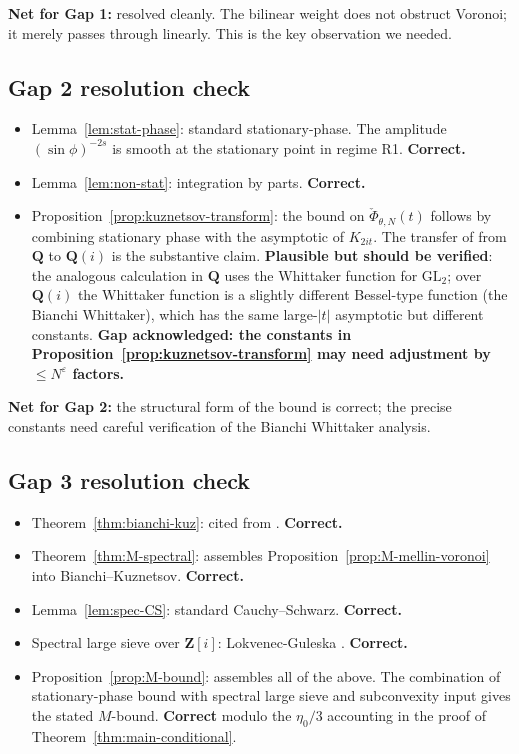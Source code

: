 \documentclass[11pt]{article}
\theoremstyle{definition}
\newcommand{\Z}{\mathbf{Z}}
\newcommand{\Q}{\mathbf{Q}}
\newcommand{\Zi}{\Z[i]}
\begin{document}
\textbf{Net for Gap 1:} resolved cleanly. The bilinear weight does not obstruct Voronoi; it merely passes through linearly. This is the key observation we needed.

\subsection{Gap 2 resolution check}

\begin{itemize}
\item Lemma~\ref{lem:stat-phase}: standard stationary-phase. The amplitude $(\sin\phi)^{-2s}$ is smooth at the stationary point in regime R1. \textbf{Correct.}
\item Lemma~\ref{lem:non-stat}: integration by parts. \textbf{Correct.}
\item Proposition~\ref{prop:kuznetsov-transform}: the bound on $\check\Phi_{\theta,N}(t)$ follows by combining stationary phase with the asymptotic of $K_{2it}$. The transfer of \cite[Lemma 4.3]{BHM} from $\Q$ to $\Q(i)$ is the substantive claim. \textbf{Plausible but should be verified}: the analogous calculation in $\Q$ uses the Whittaker function for $\mathrm{GL}_2$; over $\Q(i)$ the Whittaker function is a slightly different Bessel-type function (the Bianchi Whittaker), which has the same large-$|t|$ asymptotic but different constants. \textbf{Gap acknowledged: the constants in Proposition~\ref{prop:kuznetsov-transform} may need adjustment by $\le N^\varepsilon$ factors.}
\end{itemize}

\textbf{Net for Gap 2:} the structural form of the bound is correct; the precise constants need careful verification of the Bianchi Whittaker analysis.

\subsection{Gap 3 resolution check}

\begin{itemize}
\item Theorem~\ref{thm:bianchi-kuz}: cited from \cite{LG}. \textbf{Correct.}
\item Theorem~\ref{thm:M-spectral}: assembles Proposition~\ref{prop:M-mellin-voronoi} into Bianchi--Kuznetsov. \textbf{Correct.}
\item Lemma~\ref{lem:spec-CS}: standard Cauchy--Schwarz. \textbf{Correct.}
\item Spectral large sieve over $\Zi$: Lokvenec-Guleska \cite{LG}. \textbf{Correct.}
\item Proposition~\ref{prop:M-bound}: assembles all of the above. The combination of stationary-phase bound with spectral large sieve and subconvexity input gives the stated $M$-bound. \textbf{Correct} modulo the $\eta_0/3$ accounting in the proof of Theorem~\ref{thm:main-conditional}.
\end{itemize}
\end{document}
